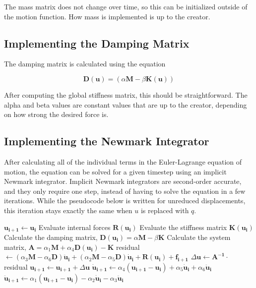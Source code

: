 \documentclass[twocolumn,10pt]{asme2ej}
\begin{document}
The mass matrix does not change over time, so this can be initialized outside of the motion function. How mass is implemented is up to the creator.

\subsection{Implementing the Damping Matrix}

The damping matrix is calculated using the equation

\begin{equation}
\bm{D}(\bm{u}) = \left(\alpha \bm{M} - \beta \bm{K}(\bm{u})\right)
\label{eq_damp}
\end{equation}

After computing the global stiffness matrix, this should be straightforward. The alpha and beta values are constant values that are up to the creator, depending on how strong the desired force is.

\subsection{Implementing the Newmark Integrator}

After calculating all of the individual terms in the Euler-Lagrange equation of motion, the equation can be solved for a given timestep using an implicit Newmark integrator. Implicit Newmark integrators are second-order accurate, and they only require one step, instead of having to solve the equation in a few iterations. While the pseudocode below is written for unreduced displacements, this iteration stays exactly the same when $u$ is replaced with $q$.

\begin{algorithmic}[1]
      \State $\bm{u_{i + 1}} \gets \bm{u_i}$
      \State Evaluate internal forces $\bm{R}(\bm{u_i})$
      \State Evaluate the stiffness matrix $\bm{K}(\bm{u_i})$
      \State Calculate the damping matrix, $\bm{D}(\bm{u_i}) = \alpha \bm{M} - \beta \bm{K}$
      \State Calculate the system matrix, $\bm{A} = \alpha_1\bm{M} + \alpha_4\bm{D}(\bm{u_i}) - \bm{K}$
      \State residual $\gets (\alpha_3\bm{M} - \alpha_6\bm{D}) \bm{ \ddot u_i} + (\alpha_2\bm{M} - \alpha_5\bm{D}) \bm{ \dot u_{i}} + \bm{R}(\bm{u_i}) + \bm{f_{i+1}}$
      \State $ \Delta \bm{u} \gets \bm{A^{-1}} \cdot $ residual
      \State $ \bm{u_{i + 1}} \gets \bm{u_{i + 1}} + \Delta \bm{u}$
      \State $ \bm{ \dot u_{i + 1}} \gets \alpha_4(\bm{u_{i+1}} - \bm{u_i}) + \alpha_5 \bm{ \dot u_i} + \alpha_6 \bm{ \ddot u_i}$
      \State $ \bm{ \ddot u_{i + 1}} \gets \alpha_1(\bm{u_{i+1}} - \bm{u_i}) - \alpha_2 \bm{\dot u_i} - \alpha_3 \bm{\ddot u_i}$
    \EndFunction
\end{algorithmic}
\end{document}
